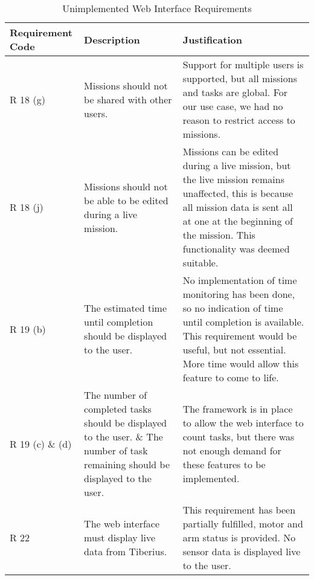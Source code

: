 \begin{table}[!htb]
\centering
\begin{tabular}{|p{2cm}|p{5cm}|p{5cm}|}
\hline

\textbf{Requirement Code} & \textbf{Description} & \textbf{Justification}   \\ \hline

R 18 (g) &
Missions should not be shared with other users. &
Support for multiple users is supported, but all missions and tasks are global. For our use case, we had no reason to restrict access to missions.
\\ \hline
R 18 (j) &
Missions should not be able to be edited during a live mission. &
Missions can be edited during a live mission, but the live mission remains unaffected, this is because all mission data is sent all at one at the beginning of the mission. This functionality was deemed suitable.
\\ \hline
R 19 (b) &
The estimated time until completion should be displayed to the user. &
No implementation of time monitoring has been done, so no indication of time until completion is available.
This requirement would be useful, but not essential. More time would allow this feature to come to life.
\\ \hline
R 19 (c) \& (d) &
The number of completed tasks should be displayed to the user. \&
The number of task remaining should be displayed to the user.&
The framework is in place to allow the web interface to count tasks, but there was not enough demand for these features to be implemented.
\\ \hline
R 22 &
The web interface must display live data from Tiberius.&
This requirement has been partially fulfilled, motor and arm status is provided. No sensor data is displayed live to the user.
\\ \hline
\end{tabular}
\caption{Unimplemented Web Interface Requirements}
\label{tab:web_requirements_verification}
\end{table}